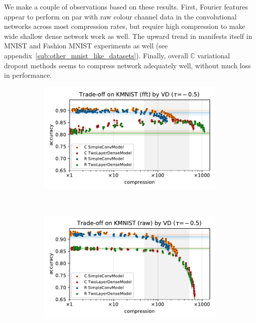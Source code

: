 \documentclass[a4paper,10pt]{article}
\newcommand{\cplx}{\mathbb{C}}
\begin{document}
We make a couple of observations based on these results. First, Fourier features appear to
perform on par with raw colour channel data in the convolutional networks across most
compression rates, but require high compression to make wide shallow dense network work
as well. The upward trend in manifests itself in MNIST and Fashion MNIST experiments as well
(see appendix~\ref{sub:other_mnist_like_datasets}). Finally, overall $\cplx$ variational
dropout methods seems to compress network adequately well, without much loss in performance.

\begin{figure}[!h]
  \centering
  \begin{subfigure}[b]{1.\textwidth}  %
    \centering
    \includegraphics[width=\linewidth]{../assets/figure__mnist-like__trade-off/legacy__VD__kmnist__fft__-0.5.pdf}
  \end{subfigure} \\%
  \begin{subfigure}[b]{1.\textwidth}  %
    \centering
    \includegraphics[width=\linewidth]{../assets/figure__mnist-like__trade-off/legacy__VD__kmnist__raw__-0.5.pdf}

\end{subfigure}
\end{figure}
\end{document}
